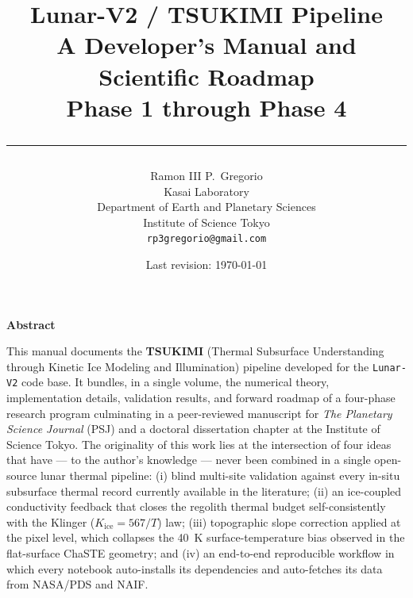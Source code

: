 \documentclass[11pt,a4paper,openany,oneside]{book}
\title{
  \vspace{-1.5cm}
  {\LARGE\bfseries Lunar-V2 / TSUKIMI Pipeline}\\[0.5em]
  {\Large A Developer's Manual and Scientific Roadmap}\\[0.3em]
  {\large Phase 1 through Phase 4}\\[1em]
  \rule{0.8\linewidth}{0.5pt}
}
\author{%
  Ramon III P.\ Gregorio\\[0.3em]
  \small Kasai Laboratory\\
  \small Department of Earth and Planetary Sciences\\
  \small Institute of Science Tokyo\\[0.5em]
  \small \texttt{rp3gregorio@gmail.com}
}
\date{Last revision: \today}
\begin{document}
\frontmatter
\maketitle

\begin{center}
\vspace*{2cm}
\begin{minipage}{0.85\linewidth}
{\large\bfseries\sffamily Abstract}\par\vspace{0.6em}
\noindent This manual documents the \textbf{TSUKIMI} (Thermal Subsurface
Understanding through Kinetic Ice Modeling and Illumination) pipeline
developed for the \texttt{Lunar-V2} code base. It bundles, in a single
volume, the numerical theory, implementation details, validation
results, and forward roadmap of a four-phase research program
culminating in a peer-reviewed manuscript for \textit{The Planetary
Science Journal} (PSJ) and a doctoral dissertation chapter at the
Institute of Science Tokyo.  The originality of this work lies at the
intersection of four ideas that have --- to the author's knowledge ---
never been combined in a single open-source lunar thermal pipeline:
(i) blind multi-site validation against every in-situ subsurface
thermal record currently available in the literature;
(ii) an ice-coupled conductivity feedback that closes the regolith
thermal budget self-consistently with the Klinger
($K_{\mathrm{ice}}=567/T$) law;
(iii) topographic slope correction applied at the pixel level, which
collapses the 40~K surface-temperature bias observed in the flat-surface
ChaSTE geometry; and
(iv) an end-to-end reproducible workflow in which every notebook
auto-installs its dependencies and auto-fetches its data from NASA/PDS
and NAIF.
\end{minipage}
\end{center}

\vfill
\begin{center}
\small
{}
\end{center}

\cleardoublepage
\tableofcontents
\cleardoublepage
\listoffigures
\cleardoublepage
\listoftables

\mainmatter








\backmatter



\end{document}
